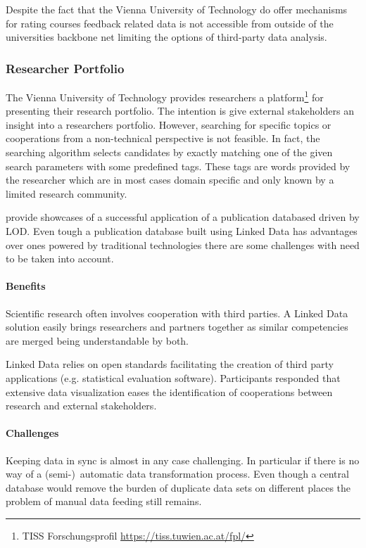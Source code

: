 \documentclass{article}
\begin{document}
Despite the fact that the Vienna University of Technology do offer mechanisms for rating courses feedback related data is not accessible from outside of the universities backbone net limiting the options of third-party data analysis. 
\subsubsection{Researcher Portfolio}
The Vienna University of Technology provides researchers a platform\footnote{TISS Forschungsprofil \url{https://tiss.tuwien.ac.at/fpl/}} for presenting their research portfolio. The intention is give external stakeholders an insight into a researchers portfolio. However, searching for specific topics or cooperations from a non-technical perspective is not feasible. In fact, the searching algorithm selects candidates by exactly matching one of the given search parameters with some predefined tags. These tags are words provided by the researcher which are in most cases domain specific and only known by a limited research community. 

\citet{article:publication-database-linked-data} provide showcases of a successful application of a publication databased driven by LOD. Even tough a publication database built using Linked Data has advantages over ones powered by traditional technologies there are some challenges with need to be taken into account. 
\paragraph{Benefits}
Scientific research often involves cooperation with third parties. A Linked Data solution easily brings researchers and partners together as similar competencies are merged being understandable by both. 

Linked Data relies on open standards facilitating the creation of third party applications (e.g. statistical evaluation software). Participants responded that extensive data visualization eases the identification of cooperations between research and external stakeholders. 
\paragraph{Challenges}
Keeping data in sync is almost in any case challenging. In particular if there is no way of a (semi-)~automatic data transformation process. Even though a central database would remove the burden of duplicate data sets on different places the problem of manual data feeding still remains. 
\end{document}

